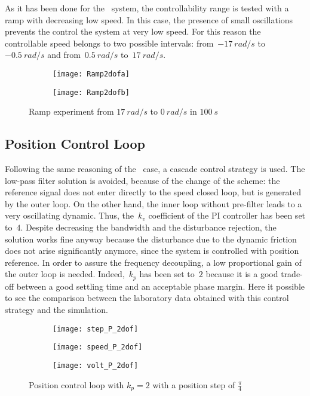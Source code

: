 As it has been done for the \onedof\ system, the controllability range is tested with a ramp with decreasing low speed. In this case, the presence of small oscillations prevents the control the system at very low speed. For this reason the controllable speed belongs to two possible intervals: from~$-17\ rad/s$ to~$-0.5\ rad/s$ and from~$0.5\ rad/s$ to~$17\ rad/s$.
\begin{figure*}[h]
	\centering
	\begin{subfigure}{0.45\columnwidth}
		\texttt{[image: Ramp2dofa]}
	\end{subfigure}
	\begin{subfigure}{0.45\columnwidth}
		\texttt{[image: Ramp2dofb]}
	\end{subfigure}

	\caption{Ramp experiment from $17\ rad/s$ to $0\ rad/s$ in $100\ s$}
	\label{fig:Ramp2dof}
\end{figure*}

\newpage
\subsection{Position Control Loop}

Following the same reasoning of the \onedof~case, a cascade control strategy is used. The low-pass filter solution is avoided, because of the change of the scheme: the reference signal does not enter directly to the speed closed loop, but is generated by the outer loop. On the other hand, the inner loop without pre-filter leads to a very oscillating dynamic. Thus, the~$k_v$ coefficient of the PI controller has been set to~$4$. Despite decreasing the bandwidth and the disturbance rejection, the solution works fine anyway because the disturbance due to the dynamic friction does not arise significantly anymore, since the system is controlled with position reference.
In order to assure the frequency decoupling, a low proportional gain of the outer loop is needed. Indeed,~$k_p$ has been set to~$2$ because it is a good trade-off between a good settling time and an acceptable phase margin.
\newline
Here it possible to see the comparison between the laboratory data obtained with this control strategy and the simulation.
\begin{figure*}[h]
	\centering
	\begin{subfigure}{0.48\columnwidth}
		\texttt{[image: step\_P\_2dof]}
	\end{subfigure}
	\begin{subfigure}{0.45\columnwidth}
		\texttt{[image: speed\_P\_2dof]}
	\end{subfigure}
	\begin{subfigure}{0.45\columnwidth}
		\texttt{[image: volt\_P\_2dof]}
	\end{subfigure}
	\caption{Position control loop with $k_{p} =2$ with a position step of $\frac{\pi}{4}$}
	\label{fig:P_2dof}
\end{figure*}

